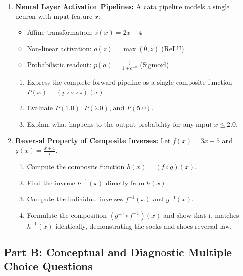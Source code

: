 \begin{enumerate}
    \item \textbf{Neural Layer Activation Pipelines:} A data pipeline models a single neuron with input feature $x$:
    \begin{itemize}
        \item Affine transformation: $z(x) = 2x - 4$
        \item Non-linear activation: $a(z) = \max(0, z)$ (ReLU)
        \item Probabilistic readout: $p(a) = \frac{1}{1 + e^{-a}}$ (Sigmoid)
    \end{itemize}
    \begin{enumerate}
        \item Express the complete forward pipeline as a single composite function $P(x) = (p \circ a \circ z)(x)$.
        \item Evaluate $P(1.0)$, $P(2.0)$, and $P(5.0)$.
        \item Explain what happens to the output probability for any input $x \le 2.0$.
    \end{enumerate}

    \item \textbf{Reversal Property of Composite Inverses:} Let $f(x) = 3x - 5$ and $g(x) = \frac{x + 4}{2}$.
    \begin{enumerate}
        \item Compute the composite function $h(x) = (f \circ g)(x)$.
        \item Find the inverse $h^{-1}(x)$ directly from $h(x)$.
        \item Compute the individual inverses $f^{-1}(x)$ and $g^{-1}(x)$.
        \item Formulate the composition $(g^{-1} \circ f^{-1})(x)$ and show that it matches $h^{-1}(x)$ identically, demonstrating the socks-and-shoes reversal law.
    \end{enumerate}
\end{enumerate}

\subsection*{Part B: Conceptual and Diagnostic Multiple Choice Questions}


